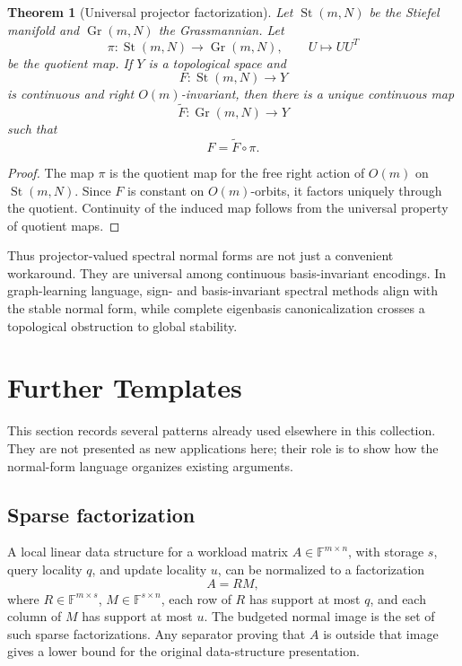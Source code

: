 \documentclass[11pt]{article}
\newtheorem{theorem}{Theorem}[section]
\DeclareMathOperator{\Gr}{Gr}
\DeclareMathOperator{\St}{St}
\begin{document}
\begin{theorem}[Universal projector factorization]
Let \(\St(m,N)\) be the Stiefel manifold and \(\Gr(m,N)\) the Grassmannian. Let
\[
\pi:\St(m,N)\to\Gr(m,N),
\qquad
U\mapsto UU^T
\]
be the quotient map. If \(Y\) is a topological space and
\[
F:\St(m,N)\to Y
\]
is continuous and right \(O(m)\)-invariant, then there is a unique continuous map
\[
\widetilde F:\Gr(m,N)\to Y
\]
such that
\[
F=\widetilde F\circ\pi.
\]
\end{theorem}

\begin{proof}
The map \(\pi\) is the quotient map for the free right action of \(O(m)\) on \(\St(m,N)\). Since \(F\) is constant on \(O(m)\)-orbits, it factors uniquely through the quotient. Continuity of the induced map follows from the universal property of quotient maps.
\end{proof}

Thus projector-valued spectral normal forms are not just a convenient workaround. They are universal among continuous basis-invariant encodings. In graph-learning language, sign- and basis-invariant spectral methods align with the stable normal form, while complete eigenbasis canonicalization crosses a topological obstruction to global stability.

\section{Further Templates}

This section records several patterns already used elsewhere in this collection. They are not presented as new applications here; their role is to show how the normal-form language organizes existing arguments.

\subsection{Sparse factorization}

A local linear data structure for a workload matrix \(A\in\mathbb F^{m\times n}\), with storage \(s\), query locality \(q\), and update locality \(u\), can be normalized to a factorization
\[
A=RM,
\]
where \(R\in\mathbb F^{m\times s}\), \(M\in\mathbb F^{s\times n}\), each row of \(R\) has support at most \(q\), and each column of \(M\) has support at most \(u\). The budgeted normal image is the set of such sparse factorizations. Any separator proving that \(A\) is outside that image gives a lower bound for the original data-structure presentation.
\end{document}
